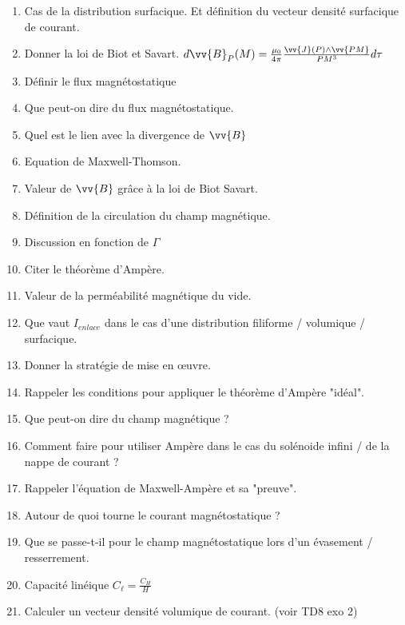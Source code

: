 \documentclass[a4paper, 11pt, hidelinks]{article}
\begin{document}
\begin{enumerate}
    \item Cas de la distribution surfacique. Et définition du vecteur densité surfacique de courant. \cite{Chapitre11}
    \item Donner la loi de Biot et Savart. $d\vv{B}_P(M)=\frac{\mu_0}{4 \pi}\frac{\vv{J}(P)\land \vv{PM}}{PM^3}d\tau$ \cite{Chapitre11}
    \item Définir le flux magnétostatique \cite{Chapitre11}
    \item Que peut-on dire du flux magnétostatique. \cite{Chapitre11}
    \item Quel est le lien avec la divergence de $\vv{B}$ \cite{Chapitre11}
    \item Equation de Maxwell-Thomson. \cite{Chapitre11}
    \item Valeur de $\vv{B}$ grâce à la loi de Biot Savart. \cite{Chapitre11}
    \item Définition de la circulation du champ magnétique. \cite{Chapitre11}
    \item Discussion en fonction de $\Gamma$ \cite{Chapitre11}
    \item Citer le théorème d'Ampère. \cite{Chapitre11}
    \item Valeur de la perméabilité magnétique du vide. \cite{Chapitre11}
    \item Que vaut $I_{enlace}$ dans le cas d'une distribution filiforme / volumique / surfacique. \cite{Chapitre11}
    \item Donner la stratégie de mise en \oe uvre. \cite{Chapitre11}
    \item Rappeler les conditions pour appliquer le théorème d'Ampère "idéal". \cite{Chapitre11}
    \item Que peut-on dire du champ magnétique ? \cite{Chapitre11}
    \item Comment faire pour utiliser Ampère dans le cas du solénoide infini / de la nappe de courant ? \cite{Chapitre11}
    \item Rappeler l'équation de Maxwell-Ampère et sa "preuve". \cite{Chapitre11}
    \item Autour de quoi tourne le courant magnétostatique ? \cite{Chapitre11}
    \item Que se passe-t-il pour le champ magnétostatique lors d'un évasement / resserrement. \cite{Chapitre11}
    \item Capacité linéique $C_{\ell}=\frac{C_H}{H}$
    \item Calculer un vecteur densité volumique de courant. (voir TD8 exo 2)
\end{enumerate}








\end{document}
